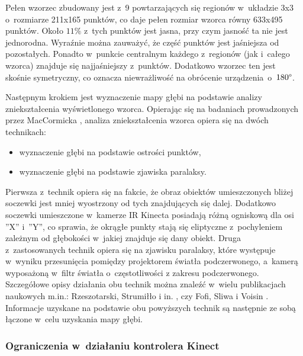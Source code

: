 Pełen wzorzec zbudowany jest z~9 powtarzających się regionów w~układzie 3x3 o~rozmiarze 211x165 punktów, co daje pełen rozmiar wzorca równy 633x495 punktów. Około $11\%$ z~tych punktów jest jasna, przy czym jasność ta nie jest jednorodna. Wyraźnie można zauważyć, że część punktów jest jaśniejsza od pozostałych. Ponadto w~punkcie centralnym każdego z~regionów (jak i~całego wzorca) znajduje się najjaśniejszy z~punktów. Dodatkowo wzorzec ten jest skośnie symetryczny, co oznacza niewrażliwość na obrócenie urządzenia~o~$180\degree$.
																																	
Następnym krokiem jest wyznaczenie mapy głębi na podstawie analizy zniekształcenia wyświetlonego wzorca. Opierając się na badaniach prowadzonych przez MacCormicka \cite{MacCormick2011}, analiza zniekształcenia wzorca opiera się na dwóch technikach:
																																	
\begin{itemize}
	\item wyznaczenie głębi na podstawie ostrości punktów,
	\item wyznaczenie głębi na podstawie zjawiska paralaksy.
\end{itemize}
																																	
Pierwsza z~technik opiera się na fakcie, że obraz obiektów umieszczonych bliżej soczewki jest mniej wyostrzony od tych znajdujących się dalej. Dodatkowo soczewki umieszczone w~kamerze IR Kinecta posiadają różną ogniskową dla osi ''X'' i~''Y'', co sprawia, że okrągłe punkty stają się eliptyczne z~pochyleniem zależnym od głębokości w~jakiej znajduje się dany obiekt. Druga z~zastosowanych technik opiera się na zjawisku paralaksy, które występuje w~wyniku przesunięcia pomiędzy projektorem światła podczerwonego, a~kamerą wyposażoną w~filtr światła o~częstotliwości z zakresu podczerwonego. Szczegółowe opisy działania obu technik można znaleźć w~wielu publikacjach naukowych m.in.: Rzeszotarski, Strumiłło i in. \cite{Rzeszotarski2006}, czy Fofi, Sliwa i Voisin \cite{Fofi2004}. Informacje uzyskane na podstawie obu powyższych technik są następnie ze sobą łączone w~celu uzyskania mapy głębi.
																																	
\subsubsection*{Ograniczenia w~działaniu kontrolera Kinect}\label{ssec:characteristics:kinect:limitation}
																																	
